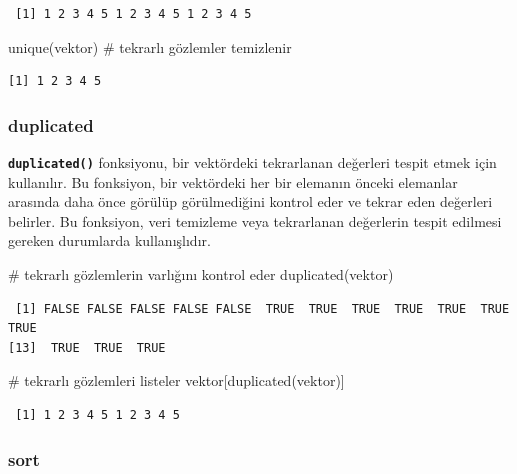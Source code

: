 \documentclass[
  letterpaper,
  DIV=11,
  numbers=noendperiod]{scrreprt}
\newenvironment{Shaded}{\begin{snugshade}}{\end{snugshade}}
\newcommand{\CommentTok}[1]{\textcolor[rgb]{0.37,0.37,0.37}{#1}}
\newcommand{\FunctionTok}[1]{\textcolor[rgb]{0.28,0.35,0.67}{#1}}
\newcommand{\NormalTok}[1]{\textcolor[rgb]{0.00,0.23,0.31}{#1}}
\begin{document}
\begin{verbatim}
 [1] 1 2 3 4 5 1 2 3 4 5 1 2 3 4 5
\end{verbatim}

\begin{Shaded}
\begin{Highlighting}[]
\FunctionTok{unique}\NormalTok{(vektor) }\CommentTok{\# tekrarlı gözlemler temizlenir}
\end{Highlighting}
\end{Shaded}

\begin{verbatim}
[1] 1 2 3 4 5
\end{verbatim}

\subsubsection{\texorpdfstring{\textbf{duplicated}}{duplicated}}\label{duplicated}

\textbf{\texttt{duplicated()}} fonksiyonu, bir vektördeki tekrarlanan
değerleri tespit etmek için kullanılır. Bu fonksiyon, bir vektördeki her
bir elemanın önceki elemanlar arasında daha önce görülüp görülmediğini
kontrol eder ve tekrar eden değerleri belirler. Bu fonksiyon, veri
temizleme veya tekrarlanan değerlerin tespit edilmesi gereken durumlarda
kullanışlıdır.

\begin{Shaded}
\begin{Highlighting}[]
\CommentTok{\# tekrarlı gözlemlerin varlığını kontrol eder}
\FunctionTok{duplicated}\NormalTok{(vektor) }
\end{Highlighting}
\end{Shaded}

\begin{verbatim}
 [1] FALSE FALSE FALSE FALSE FALSE  TRUE  TRUE  TRUE  TRUE  TRUE  TRUE  TRUE
[13]  TRUE  TRUE  TRUE
\end{verbatim}

\begin{Shaded}
\begin{Highlighting}[]
\CommentTok{\# tekrarlı gözlemleri listeler}
\NormalTok{vektor[}\FunctionTok{duplicated}\NormalTok{(vektor)]}
\end{Highlighting}
\end{Shaded}

\begin{verbatim}
 [1] 1 2 3 4 5 1 2 3 4 5
\end{verbatim}

\subsubsection{\texorpdfstring{\textbf{sort}}{sort}}\label{sort}
\end{document}
